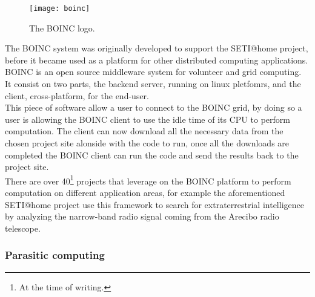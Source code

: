 \begin{figure}[htb]
    \centering
    \texttt{[image: boinc]}
    \caption{The \acs{BOINC} logo.}
    \label{fig:boinc}
\end{figure}
The \ac{BOINC} system was originally developed to support the \ac{SETI@home}
project, before it became used as a platform for other distributed computing
applications. \ac{BOINC} is an open source middleware system for volunteer
and grid computing. It consist on two parts, the backend server, running on
linux pletfomrs, and the client, cross-platform, for the end-user.\\

This piece of software allow a user to connect to the \ac{BOINC} grid, by doing
so a user is allowing the \ac{BOINC} client to use the idle time of its CPU to
perform computation. The client can now  download all the necessary data from the
chosen project site alonside with the code to run, once all the downloads are
completed the \ac{BOINC} client can run the code and send the results back to
the project site.\\

There are over 40\footnote{At the time of writing.} projects that leverage on
the \ac{BOINC} platform to perform computation on different application areas,
for example the aforementioned \ac{SETI@home} project use this framework to
search for extraterrestrial intelligence by analyzing the narrow-band radio
signal coming from the Arecibo radio telescope.


\subsubsection{Parasitic computing}
\label{sec:bg:crowd:auto:parasitic}
